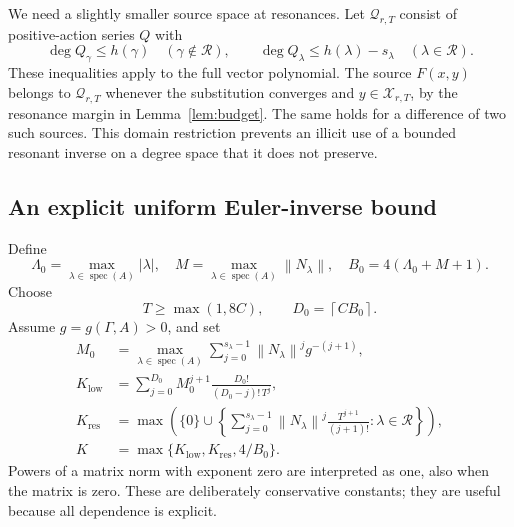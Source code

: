 \documentclass[11pt,a4paper]{article}
\numberwithin{equation}{section}
\theoremstyle{definition}
\theoremstyle{remark}
\newcommand{\G}{\Gamma}
\newcommand{\Reson}{\mathcal R}
\newcommand{\spec}{\operatorname{spec}}
\newcommand{\norm}[1]{\left\lVert #1\right\rVert}
\newcommand{\ceil}[1]{\left\lceil #1\right\rceil}
\begin{document}
We need a slightly smaller source space at resonances. Let
\(\mathcal Q_{r,T}\) consist of positive-action series \(Q\) with
\[
 \deg Q_\gamma\le h(\gamma)\quad(\gamma\notin\Reson),
 \qquad
 \deg Q_\lambda\le h(\lambda)-s_\lambda
                    \quad(\lambda\in\Reson).
\]
These inequalities apply to the full vector polynomial. The source
\(F(x,y)\) belongs to \(\mathcal Q_{r,T}\) whenever the substitution
converges and \(y\in\mathcal X_{r,T}\), by the resonance margin in
Lemma~\ref{lem:budget}. The same holds for a difference of two such
sources. This domain restriction prevents an illicit use of a bounded
resonant inverse on a degree space that it does not preserve.

\subsection{An explicit uniform Euler-inverse bound}
Define
\begin{equation}\label{eq:analytic-constants}
 \Lambda_0=\max_{\lambda\in\spec(A)}|\lambda|,
 \quad M=\max_{\lambda\in\spec(A)}\norm{N_\lambda},
 \quad B_0=4(\Lambda_0+M+1).
\end{equation}
Choose
\begin{equation}\label{eq:T-choice}
 T\ge\max(1,8C),\qquad D_0=\ceil{CB_0}.
\end{equation}
Assume \(g=g(\G,A)>0\), and set
\begin{align}
 M_0&=\max_{\lambda\in\spec(A)}
      \sum_{j=0}^{s_\lambda-1}
         \norm{N_\lambda}^{j}g^{-(j+1)},
       \label{eq:Mzero}\\
 K_{\mathrm{low}}&=
      \sum_{j=0}^{D_0}M_0^{j+1}
           \frac{D_0!}{(D_0-j)!\,T^j},
       \label{eq:Klow}\\
 K_{\mathrm{res}}&=
      \max\left(\{0\}\cup
      \left\{\sum_{j=0}^{s_\lambda-1}
           \norm{N_\lambda}^{j}\frac{T^{j+1}}{(j+1)!}
           :\lambda\in\Reson\right\}\right),
       \label{eq:Kres}\\
 K&=\max\{K_{\mathrm{low}},K_{\mathrm{res}},4/B_0\}.
       \label{eq:K}
\end{align}
Powers of a matrix norm with exponent zero are interpreted as one,
also when the matrix is zero. These are deliberately conservative
constants; they are useful because all dependence is explicit.
\end{document}
